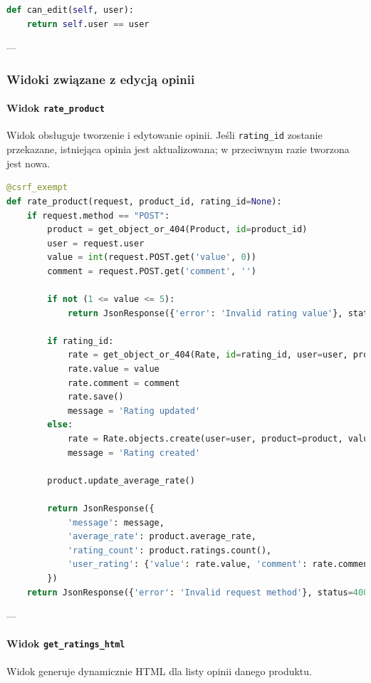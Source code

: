 \documentclass[12pt,a4paper,oneside]{article}
\theoremstyle{definition}
\numberwithin{equation}{section}
\begin{document}
\begin{lstlisting}[language=Python, caption=Metoda \texttt{can\_edit}]
def can_edit(self, user):
    return self.user == user
\end{lstlisting}

---

\subsubsection{Widoki związane z edycją opinii}

\paragraph{Widok \texttt{rate\_product}}
Widok obsługuje tworzenie i edytowanie opinii. Jeśli \texttt{rating\_id} zostanie przekazane, istniejąca opinia jest aktualizowana; w przeciwnym razie tworzona jest nowa.

\begin{lstlisting}[language=Python, caption=Widok \texttt{rate\_product}, label=rate_product_view]
@csrf_exempt
def rate_product(request, product_id, rating_id=None):
    if request.method == "POST":
        product = get_object_or_404(Product, id=product_id)
        user = request.user
        value = int(request.POST.get('value', 0))
        comment = request.POST.get('comment', '')

        if not (1 <= value <= 5):
            return JsonResponse({'error': 'Invalid rating value'}, status=400)

        if rating_id:
            rate = get_object_or_404(Rate, id=rating_id, user=user, product=product)
            rate.value = value
            rate.comment = comment
            rate.save()
            message = 'Rating updated'
        else:
            rate = Rate.objects.create(user=user, product=product, value=value, comment=comment)
            message = 'Rating created'

        product.update_average_rate()

        return JsonResponse({
            'message': message,
            'average_rate': product.average_rate,
            'rating_count': product.ratings.count(),
            'user_rating': {'value': rate.value, 'comment': rate.comment}
        })
    return JsonResponse({'error': 'Invalid request method'}, status=400)
\end{lstlisting}

---

\paragraph{Widok \texttt{get\_ratings\_html}}
Widok generuje dynamicznie HTML dla listy opinii danego produktu.
\end{document}
